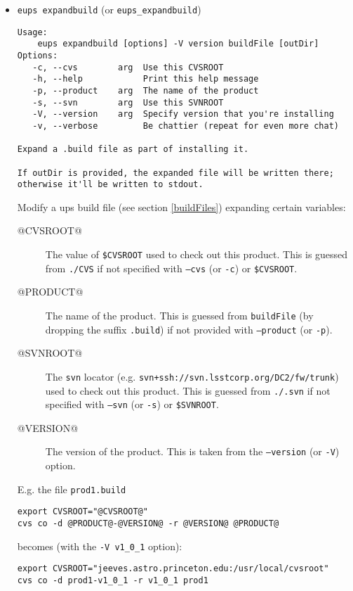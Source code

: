 \documentclass{article}
\newcommand{\code}[1]{\texttt{#1}}
\begin{document}
\begin{itemize}

  \item \code{eups expandbuild} (or \code{eups\_expandbuild})
\begin{verbatim}
Usage:
    eups expandbuild [options] -V version buildFile [outDir]
Options:
   -c, --cvs        arg  Use this CVSROOT
   -h, --help            Print this help message
   -p, --product    arg  The name of the product
   -s, --svn        arg  Use this SVNROOT   
   -V, --version    arg  Specify version that you're installing
   -v, --verbose         Be chattier (repeat for even more chat)
    
Expand a .build file as part of installing it.

If outDir is provided, the expanded file will be written there;
otherwise it'll be written to stdout.
\end{verbatim}

Modify a ups build file (see section \ref{buildFiles}) expanding certain variables:
\begin{description}
  \item[\small @CVSROOT@] The value of \code{\$CVSROOT} used to check out this product.
    This is guessed from \code{./CVS} if not specified with \code{--cvs} (or \code{-c})
    or \code{\$CVSROOT}.
  \item[\small @PRODUCT@] The name of the product. This is guessed from \code{buildFile}
    (by dropping the suffix \code{.build}) if not provided with \code{--product} (or \code{-p}).
  \item[\small @SVNROOT@] The \code{svn} locator (e.g. \code{svn+ssh://svn.lsstcorp.org/DC2/fw/trunk})
    used to check out this product.
    This is guessed from \code{./.svn} if not specified with \code{--svn} (or \code{-s})
    or \code{\$SVNROOT}.
  \item[\small @VERSION@] The version of the product.  This is taken from the \code{--version} (or
    \code{-V}) option.
\end{description}

E.g. the file \code{prod1.build}
\begin{verbatim}
export CVSROOT="@CVSROOT@"
cvs co -d @PRODUCT@-@VERSION@ -r @VERSION@ @PRODUCT@
\end{verbatim}
becomes (with the \code{-V v1\_0\_1} option):
\begin{verbatim}
export CVSROOT="jeeves.astro.princeton.edu:/usr/local/cvsroot"
cvs co -d prod1-v1_0_1 -r v1_0_1 prod1
\end{verbatim}


\end{itemize}
\end{document}
